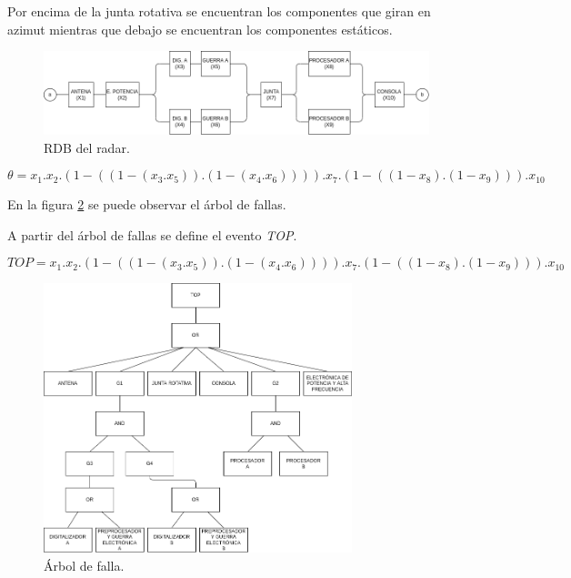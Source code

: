 \documentclass[
    11pt,
    spanish,
    a4paper
]{article}
\begin{document}
Por encima de la junta rotativa se encuentran los componentes que giran en azimut mientras que debajo se encuentran los componentes estáticos.

\begin{figure}[htbp]
	\centering
	\includegraphics[width=\textwidth]{img/rdb_radar.png}
	\caption{RDB del radar.}
	\label{fig:rdb_radar}
\end{figure}


\begin{dmath}
	\theta = x_1 . x_2 . (1 - ((1 - (x_3 . x_5)) . (1-(x_4 . x_6)) )) . x_7 . (1 - ((1 - x_8).(1 - x_9))) . x_{10}
\end{dmath}

En la figura \ref{fig:arbol} se puede observar el árbol de fallas.

A partir del árbol de fallas se define el evento \emph{TOP}.

\begin{dmath}
	TOP = x_1 . x_2 . (1 - ((1 - (x_3 . x_5)) . (1-(x_4 . x_6)) )) . x_7 . (1 - ((1 - x_8).(1 - x_9))) . x_{10}
\end{dmath}


\begin{figure}[htbp]
	\centering
	\includegraphics[width=0.8\textwidth]{img/arbol_radar.png}
	\caption{Árbol de falla.}
	\label{fig:arbol}
\end{figure}
\end{document}
